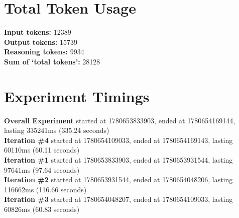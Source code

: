 \documentclass{article}
\begin{document}
\section*{Total Token Usage}
\textbf{Input tokens: }12389
\\\textbf{Output tokens: }15739
\\\textbf{Reasoning tokens: }9934
\\\textbf{Sum of `total tokens': }28128
\section*{Experiment Timings}
\textbf{Overall Experiment} started at 1780653833903, ended at 1780654169144, lasting 335241ms (335.24 seconds)
\\\textbf{Iteration \#4} started at 1780654109033, ended at 1780654169143, lasting 60110ms (60.11 seconds)
\\\textbf{Iteration \#1} started at 1780653833903, ended at 1780653931544, lasting 97641ms (97.64 seconds)
\\\textbf{Iteration \#2} started at 1780653931544, ended at 1780654048206, lasting 116662ms (116.66 seconds)
\\\textbf{Iteration \#3} started at 1780654048207, ended at 1780654109033, lasting 60826ms (60.83 seconds)
\end{document}

